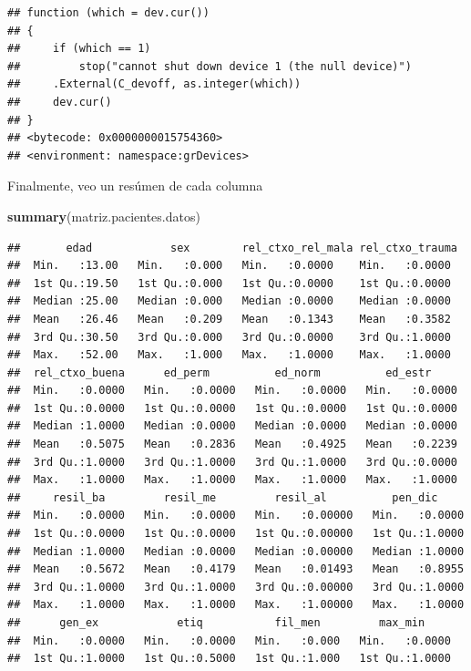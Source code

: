 \documentclass[]{article}
\newenvironment{Shaded}{\begin{snugshade}}{\end{snugshade}}
\newcommand{\KeywordTok}[1]{\textcolor[rgb]{0.13,0.29,0.53}{\textbf{#1}}}
\newcommand{\NormalTok}[1]{#1}
\begin{document}
\begin{verbatim}
## function (which = dev.cur()) 
## {
##     if (which == 1) 
##         stop("cannot shut down device 1 (the null device)")
##     .External(C_devoff, as.integer(which))
##     dev.cur()
## }
## <bytecode: 0x0000000015754360>
## <environment: namespace:grDevices>
\end{verbatim}

Finalmente, veo un resúmen de cada columna

\begin{Shaded}
\begin{Highlighting}[]
\KeywordTok{summary}\NormalTok{(matriz.pacientes.datos)}
\end{Highlighting}
\end{Shaded}

\begin{verbatim}
##       edad            sex        rel_ctxo_rel_mala rel_ctxo_trauma 
##  Min.   :13.00   Min.   :0.000   Min.   :0.0000    Min.   :0.0000  
##  1st Qu.:19.50   1st Qu.:0.000   1st Qu.:0.0000    1st Qu.:0.0000  
##  Median :25.00   Median :0.000   Median :0.0000    Median :0.0000  
##  Mean   :26.46   Mean   :0.209   Mean   :0.1343    Mean   :0.3582  
##  3rd Qu.:30.50   3rd Qu.:0.000   3rd Qu.:0.0000    3rd Qu.:1.0000  
##  Max.   :52.00   Max.   :1.000   Max.   :1.0000    Max.   :1.0000  
##  rel_ctxo_buena      ed_perm          ed_norm          ed_estr      
##  Min.   :0.0000   Min.   :0.0000   Min.   :0.0000   Min.   :0.0000  
##  1st Qu.:0.0000   1st Qu.:0.0000   1st Qu.:0.0000   1st Qu.:0.0000  
##  Median :1.0000   Median :0.0000   Median :0.0000   Median :0.0000  
##  Mean   :0.5075   Mean   :0.2836   Mean   :0.4925   Mean   :0.2239  
##  3rd Qu.:1.0000   3rd Qu.:1.0000   3rd Qu.:1.0000   3rd Qu.:0.0000  
##  Max.   :1.0000   Max.   :1.0000   Max.   :1.0000   Max.   :1.0000  
##     resil_ba         resil_me         resil_al          pen_dic      
##  Min.   :0.0000   Min.   :0.0000   Min.   :0.00000   Min.   :0.0000  
##  1st Qu.:0.0000   1st Qu.:0.0000   1st Qu.:0.00000   1st Qu.:1.0000  
##  Median :1.0000   Median :0.0000   Median :0.00000   Median :1.0000  
##  Mean   :0.5672   Mean   :0.4179   Mean   :0.01493   Mean   :0.8955  
##  3rd Qu.:1.0000   3rd Qu.:1.0000   3rd Qu.:0.00000   3rd Qu.:1.0000  
##  Max.   :1.0000   Max.   :1.0000   Max.   :1.00000   Max.   :1.0000  
##      gen_ex            etiq           fil_men         max_min      
##  Min.   :0.0000   Min.   :0.0000   Min.   :0.000   Min.   :0.0000  
##  1st Qu.:1.0000   1st Qu.:0.5000   1st Qu.:1.000   1st Qu.:1.0000  

\end{verbatim}
\end{document}
